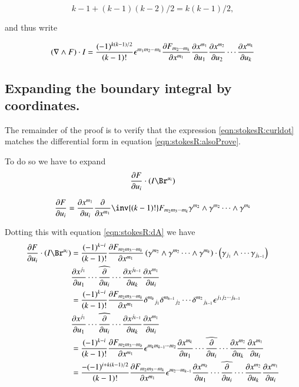\begin{equation*}
k-1 + (k-1)(k-2)/2
= k(k -1 )/2,
\end{equation*}

and thus write

\begin{align}\label{eqn:stokesR:curldot}
(\grad \wedge F ) \cdot I
= \frac{(-1)^{k(k-1)/2}}{(k-1)!} 
\epsilon^{m_1 m_2 \cdots m_k}
\PD{x^{m_{1}}}{F_{m_2 \cdots m_{k}}}
\PD{u_1}{x^{m_1}} \PD{u_2}{x^{m_2}} \cdots \PD{u_k}{x^{m_k}}
\end{align}

\subsection{Expanding the boundary integral by coordinates. }

The remainder of the proof is to verify that the expression \ref{eqn:stokesR:curldot} matches the differential form in equation \ref{eqn:stokesR:alsoProve}.

To do so we have to expand
\begin{equation*}
\PD{u_i}{F} \cdot (I \Br^{u_i})
\end{equation*}

\begin{align*}
\PD{u_i}{F}
&=
\PD{u_i}{x^{m_1}}
\PD{x^{m_1}}{}
\inv{(k-1)!} F_{m_2 m_3 \cdots m_{k}} \gamma^{m_2} \wedge \gamma^{m_2} \cdots \wedge \gamma^{m_{k}} \\
\end{align*}

Dotting this with equation \ref{eqn:stokesR:dA} we have
\begin{align*}
\PD{u_i}{F} \cdot (I \Br^{u_i})
&=
\frac{(-1)^{k-i}}{(k-1)!}
\PD{x^{m_1}}{F_{m_2 m_3 \cdots m_{k}}}
\left( \gamma^{m_2} \wedge \gamma^{m_2} \cdots \wedge \gamma^{m_{k}} \right) \cdot
\left( \gamma_{j_1} \wedge \cdots \gamma_{j_{k-1}} \right) \\
&\PD{u_1}{x^{j_1}} \cdots \widehat{\PD{u_i}{}} \cdots \PD{u_k}{x^{j_{k-1}}} \PD{u_i}{x^{m_1}} \\
&=
\frac{(-1)^{k-i}}{(k-1)!}
\PD{x^{m_1}}{F_{m_2 m_3 \cdots m_{k}}}
{\delta^{m_k}}_{j_1}
{\delta^{m_{k-1}}}_{j_2}
\cdots
{\delta^{m_{2}}}_{j_{k-1}}
\epsilon^{j_1 j_2 \cdots j_{k-1}} \\
&\PD{u_1}{x^{j_1}} \cdots \widehat{\PD{u_i}{}} \cdots \PD{u_k}{x^{j_{k-1}}} \PD{u_i}{x^{m_1}} \\
&=
\frac{(-1)^{k-i}}{(k-1)!}
\PD{x^{m_1}}{F_{m_2 m_3 \cdots m_{k}}}
\epsilon^{m_k m_{k-1} \cdots m_{2}} 
\PD{u_1}{x^{m_k}} \cdots \widehat{\PD{u_i}{}} \cdots \PD{u_k}{x^{m_{2}}} \PD{u_i}{x^{m_1}} \\
&=
\frac{-(-1)^{i + k(k-1)/2}}{(k-1)!}
\PD{x^{m_1}}{F_{m_2 m_3 \cdots m_{k}}}
\epsilon^{m_2 \cdots m_{k-1}} 
\PD{u_1}{x^{m_k}} \cdots \widehat{\PD{u_i}{}} \cdots \PD{u_k}{x^{m_{2}}} \PD{u_i}{x^{m_1}} \\
\end{align*}

